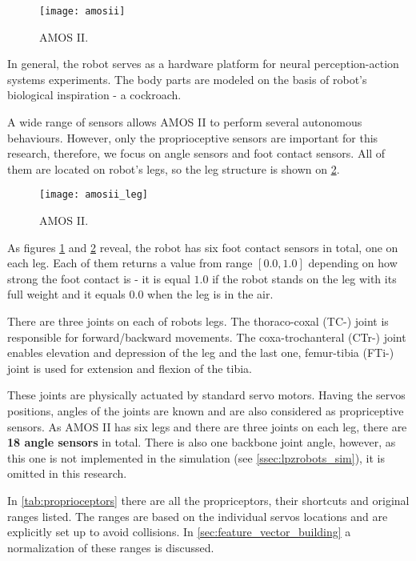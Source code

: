\begin{figure}[H]
  \centering
  \texttt{[image: amosii]}
  \caption{AMOS II. \citep{misc:amosii}}
  \label{img:amosii}
\end{figure}

In general, the robot serves as a hardware platform for neural perception-action systems experiments. The body parts are modeled on the basis of robot's biological inspiration - a cockroach.

A wide range of sensors allows AMOS II to perform several autonomous behaviours. However, only the proprioceptive sensors are important for this research, therefore, we focus on angle sensors and foot contact sensors. All of them are located on robot's legs, so the leg structure is shown on \cref{img:amosii_leg}.

\begin{figure}[H]
  \centering
  \texttt{[image: amosii\_leg]}
  \caption{AMOS II. \citep{misc:amosii}}
  \label{img:amosii_leg}
\end{figure}

As figures \ref{img:amosii} and \ref{img:amosii_leg} reveal, the robot has six foot contact sensors in total, one on each leg. Each of them returns a value from range $ [0.0, 1.0] $ depending on how strong the foot contact is - it is equal $ 1.0 $ if the robot stands on the leg with its full weight and it equals $ 0.0 $ when the leg is in the air.

There are three joints on each of robots legs. The thoraco-coxal (TC-) joint is responsible for forward/backward movements. The coxa-trochanteral (CTr-) joint enables elevation and depression of the leg and the last one, femur-tibia (FTi-) joint is used for extension and flexion of the tibia.

These joints are physically actuated by standard servo motors. Having the servos positions, angles of the joints are known and are also considered as propriceptive sensors. As AMOS II has six legs and there are three joints on each leg, there are \textbf{18 angle sensors} in total. There is also one backbone joint angle, however, as this one is not implemented in the simulation (see \cref{ssec:lpzrobots_sim}), it is omitted in this research.

In \cref{tab:proprioceptors} there are all the propriceptors, their shortcuts and original ranges listed. The ranges are based on the individual servos locations and are explicitly set up to avoid collisions. In \cref{sec:feature_vector_building} a normalization of these ranges is discussed.

